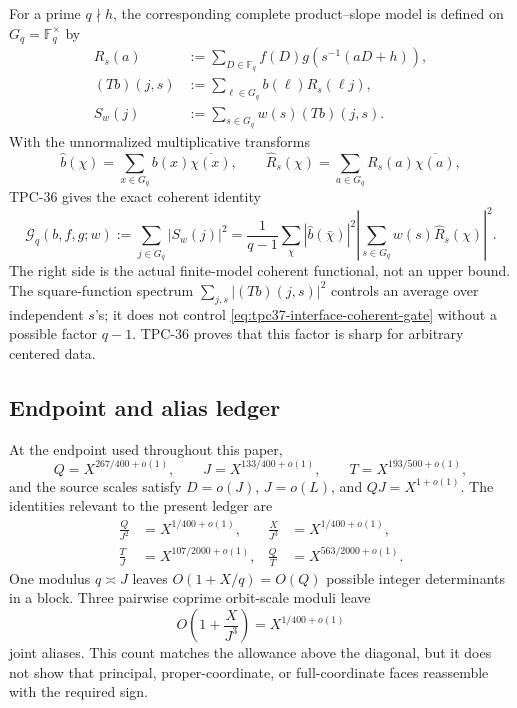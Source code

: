 For a prime $q\nmid h$, the corresponding complete product--slope model
is defined on $G_q=\mathbb F_q^\times$ by
\begin{align}
 R_s(a)
 &:=\sum_{D\in\mathbb F_q}
 f(D)g\!\left(s^{-1}(aD+h)\right),
 \label{eq:tpc37-interface-Rsa}\\
 (Tb)(j,s)
 &:=\sum_{\ell\in G_q}b(\ell)R_s(\ell j),
 \label{eq:tpc37-interface-Tb}\\
 S_w(j)&:=\sum_{s\in G_q}w(s)(Tb)(j,s).
 \label{eq:tpc37-interface-Sw}
\end{align}
With the unnormalized multiplicative transforms
\begin{equation}
 \widehat b(\chi)=\sum_{x\in G_q}b(x)\overline{\chi(x)},
 \qquad
 \widehat R_s(\chi)=\sum_{a\in G_q}R_s(a)\overline{\chi(a)},
 \label{eq:tpc37-interface-transforms}
\end{equation}
TPC-36 gives the exact coherent identity
\begin{equation}
 \boxed{
 \mathcal G_q(b,f,g;w)
 :=\sum_{j\in G_q}|S_w(j)|^2
 =\frac1{q-1}\sum_\chi
 |\widehat b(\bar\chi)|^2
 \left|\sum_{s\in G_q}w(s)\widehat R_s(\chi)\right|^2.}
 \label{eq:tpc37-interface-coherent-gate}
\end{equation}
The right side is the actual finite-model coherent functional, not an
upper bound.  The square-function spectrum
$\sum_{j,s}|(Tb)(j,s)|^2$ controls an average over independent $s$'s;
it does not control \eqref{eq:tpc37-interface-coherent-gate} without a
possible factor $q-1$.  TPC-36 proves that this factor is sharp for
arbitrary centered data.

\subsection{Endpoint and alias ledger}

At the endpoint used throughout this paper,
\begin{equation}
 Q=X^{267/400+o(1)},\qquad
 J=X^{133/400+o(1)},\qquad
 T=X^{193/500+o(1)},
 \label{eq:tpc37-interface-endpoint}
\end{equation}
and the source scales satisfy $D=o(J)$, $J=o(L)$, and
$QJ=X^{1+o(1)}$.  The identities relevant to the present ledger are
\begin{align}
 \frac Q{J^2}
 &=X^{1/400+o(1)},
 &\frac X{J^3}
 &=X^{1/400+o(1)},
 \label{eq:tpc37-interface-critical-identities}\\
 \frac T J
 &=X^{107/2000+o(1)},
 &\frac QT
 &=X^{563/2000+o(1)}.
 \label{eq:tpc37-interface-secondary-identities}
\end{align}
One modulus $q\asymp J$ leaves $O(1+X/q)=O(Q)$ possible integer
determinants in a block.  Three pairwise coprime orbit-scale moduli leave
\begin{equation}
 O\!\left(1+\frac X{J^3}\right)
 =X^{1/400+o(1)}
 \label{eq:tpc37-interface-three-modulus-aliases}
\end{equation}
joint aliases.  This count matches the allowance above the diagonal, but
it does not show that principal, proper-coordinate, or full-coordinate
faces reassemble with the required sign.

